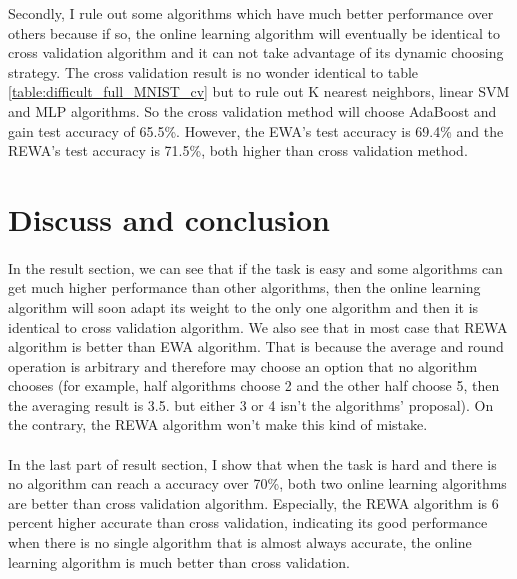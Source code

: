 \documentclass{gapd}
\begin{document}
	Secondly, I rule out some algorithms which have much better performance over others because if so, the online learning algorithm will eventually be identical to cross validation algorithm and it can not take advantage of its dynamic choosing strategy. The cross validation result is no wonder identical to table \ref{table:difficult_full_MNIST_cv} but to rule out K nearest neighbors, linear SVM and MLP algorithms. So the cross validation method will choose AdaBoost and gain test accuracy of 65.5\%. However, the EWA's test accuracy is 69.4\% and the REWA's test accuracy is 71.5\%, both higher than cross validation method. 



\section{Discuss and conclusion}
\label{sec:discuss_conclusion}
\paragraph{}
\lettrine{I}{}n the result section, we can see that if the task is easy and some algorithms can get much higher performance than other algorithms, then the online learning algorithm will soon adapt its weight to the only one algorithm and then it is identical to cross validation algorithm. We also see that in most case that REWA algorithm is better than EWA algorithm. That is because the average and round operation is arbitrary and therefore may choose an option that no algorithm chooses (for example, half algorithms choose 2 and the other half choose 5, then the averaging result is 3.5. but either 3 or 4 isn't the algorithms' proposal). On the contrary, the REWA algorithm won't make this kind of mistake. 
\paragraph{}
	In the last part of result section, I show that when the task is hard and there is no algorithm can reach a accuracy over 70\%, both two online learning algorithms are better than cross validation algorithm. Especially, the REWA algorithm is 6 percent higher accurate than cross validation, indicating its good performance when there is no single algorithm that is almost always accurate, the online learning algorithm is much better than cross validation. 
\end{document}
